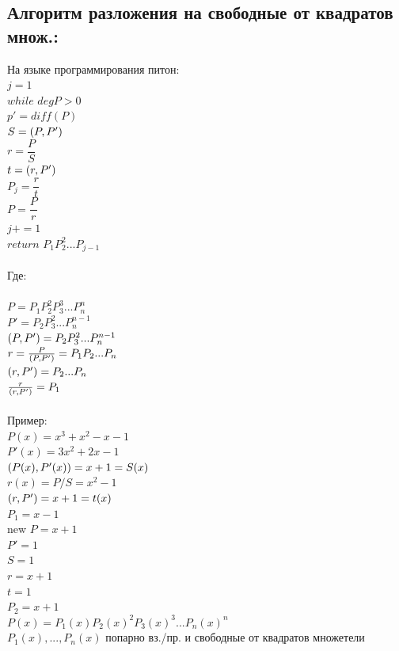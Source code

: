 \documentclass[12pt]{article}
\let\gcd\relax
\DeclareMathOperator{\gcd}{НОД}
\begin{document}
    \subsection{Алгоритм разложения на свободные от  квадратов множ.:}
    \noindent На языке программирования питон:
    \\$j=1$
        \\$while$ $deg P>0$
    \\\indent$p' = diff(P)$
    \\\indent$S=\gcd(P,P')$
    \\\indent$r = \dfrac{P}{S}$
    \\\indent$t = \gcd(r,P')$
    \\\indent$P_j=\dfrac{r}{t}$
    \\\indent$P=\dfrac{P}{r}$
    \\\indent$j+= 1$
    \\$return$ $P_1P^2_2...P_{j-1}$
        \\
        \\Где:
        \\
        \\$P=P_1P^2_2P^3_3...P^n_n$
    \\$P'=P_2P^2_3...P_n^{n-1}$
        \\$\gcd(P,P')=P_2P_3^2...P_n^{n-1}$
    \\$r=\frac{P}{\gcd(P,P')}=P_1P_2...P_n$
        \\$\gcd(r,P')=P_2...P_n$
    \\$\frac{r}{\gcd(r,P')}=P_1$
        \\
        \\Пример:
        \\$P(x)=x^3+x^2-x-1$
    \\$P'(x)=3x^2+2x-1$
        \\$\gcd(P(x),P'(x))=x+1=S(x)$
    \\$r(x)= P/S=x^2-1$
        \\$\gcd(r,P')=x+1=t(x)$
    \\$P_1=x-1$
        \\new $P=x+1$
        \\$P'=1$
    \\$S=1$
        \\$r = x+1$
    \\$t = 1$
        \\$P_2=x+1$
    \\$P(x) = P_1(x)P_2(x)^2P_3(x)^3...P_n(x)^n$
        \\$P_1(x),...,P_n(x)$ попарно вз./пр. и свободные от квадратов множетели
\end{document}
